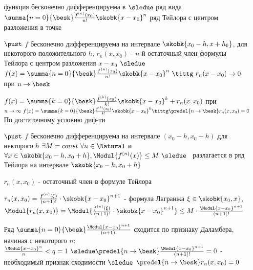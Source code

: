 \begin{defs}
	функция бесконечно дифференцируема в  $\sledue$ ряд вида $\summa{n=0}{\besk}\frac{f^{(n)}(x_0)}{n!}\skobk{x-x_0}^n$ ряд Тейлора с центром разложения в точке 
\end{defs}

\begin{proofs}
	$\pust$ $f$ бесконечно дифференцируема на интервале $\skobk{x_0 - h, x+h_0}$, для некоторого положительного $h$, $r_n(x,x_0)$ - $n$-й остаточный член формулы Тейлора с центром разложения $x - x_0$ $\sledue$ $f(x) = \summa{n=0}{\besk}\frac{f^{(n)}(x_0)}{n!}\skobk{x - x_0}^n \ \tittg \ r_n(x - x_0) \to 0$ при $n \to \besk$
	\begin{dokvo}
		$f(x) = \summa{k=0}{\besk}\frac{f^{(k)}(x_0)}{k!}\skobk{x-x_0}^k + r_n(x,x_0)$ при $n \to \infty \ f(x) = \summa{k=0}{\besk}\frac{f^{(k)}(x_0)}{k!}\skobk{x-x_0}^{k} \tittg \predel{n\to \besk}r_n(x,x_0) =0$ По достаточному условию диф-ти
	\end{dokvo}
\end{proofs}

\begin{proofs}
	$\pust$ $f$ бесконечно дифференцируема на интервале $(x_0 - h, x_0 + h)$ для некторого $h$ $\exists M = const \ \forall n \in \Natural$ и $\forall x \in \skobk{x_0 - h, x_0 + h}, \Modul{f^{(n)}(x)}\leq M \ \sledue$ \fx \ разлагается в ряд Тейлора на интервале $\skobk{x_0 - h, x_0 + h}$
	\begin{dokvo}
		$r_n(x,x_0)$ - остаточный член в формуле Тейлора

		$r_n(x,x_0) = \frac{f^{(n)}(\xi)}{(n+1)!}\cdot \skobk{x-x_0}^{n+1}$ - формула Лагранжа $\xi \in \skobk{x_0, x}$, $\Modul{r_n(x,x_0)} = \Modul{\frac{f^{(n)}(\xi)}{(n+1)!}\cdot \skobk{x-x_0}^{n+1}} \leq M \cdot \frac{\Modul{x-x_0}^{n+1}}{(n+1)!}$

		Ряд $\summa{n=0}{\besk}\frac{\Modul{x-x_0}^{n+1}}{(n+1)!}$ сходится по признаку Даламбера, начиная с некоторого $n: $ $\frac{\Modul{x - x_0}^n}{n} < q = 1 \ \sledue \predel{n \to \besk}\frac{\Modul{x-x_0}^{n+1}}{(n+1)!} = 0$ - необходимый признак сходимости $\sledue$ $\predel{n \to \besk}r_n(x,x_0) = 0$

	\end{dokvo}
\end{proofs}
\newpage
